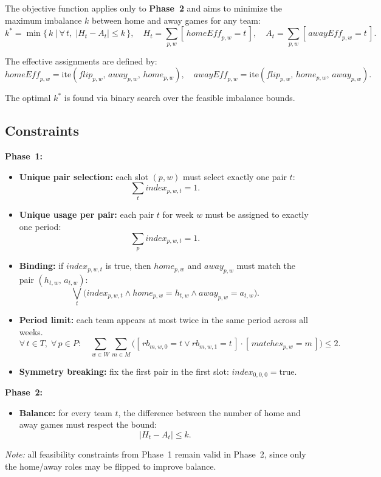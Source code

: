 The objective function applies only to \textbf{Phase~2} and aims to minimize the maximum imbalance $k$ between home and away games for any team:
\[
k^* = \min \Big\{\, k ~\Big|~ \forall\, t,\; |H_t - A_t| \leq k\, \Big\},
\quad H_t = \sum_{p,w} [\,\mathit{homeEff}_{p,w} = t\,], \quad
A_t = \sum_{p,w} [\,\mathit{awayEff}_{p,w} = t\,].
\]

The effective assignments are defined by:
\[
\mathit{homeEff}_{p,w} = \text{ite}(\mathit{flip}_{p,w},\, \mathit{away}_{p,w},\, \mathit{home}_{p,w}), \quad
\mathit{awayEff}_{p,w} = \text{ite}(\mathit{flip}_{p,w},\, \mathit{home}_{p,w},\, \mathit{away}_{p,w}).
\]

The optimal $k^*$ is found via binary search over the feasible imbalance bounds.

\subsection{Constraints}

\textbf{Phase~1:}
\begin{itemize}
    \item \textbf{Unique pair selection:} each slot $(p,w)$ must select exactly one pair $t$:
    \[
    \sum_{t} \mathit{index}_{p,w,t} = 1.
    \]
    \item \textbf{Unique usage per pair:} each pair $t$ for week $w$ must be assigned to exactly one period:
    \[
    \sum_{p} \mathit{index}_{p,w,t} = 1.
    \]
    \item \textbf{Binding:} if $\mathit{index}_{p,w,t}$ is true, then $\mathit{home}_{p,w}$ and $\mathit{away}_{p,w}$ must match the pair $(h_{t,w},\, a_{t,w})$:
    \[
    \bigvee_{t} \Big(
      \mathit{index}_{p,w,t} \wedge 
      \mathit{home}_{p,w} = h_{t,w} \wedge 
      \mathit{away}_{p,w} = a_{t,w}
    \Big).
    \]
    \item \textbf{Period limit:} each team appears at most twice in the same period across all weeks.
    \[
    \forall\, t \in T,\; \forall\, p \in P:\quad
    \sum_{w \in W}
    \sum_{m \in M}
    \big(
      [\, rb_{m,w,0} = t \vee rb_{m,w,1} = t\, ]
      \cdot [\, matches_{p,w} = m\, ]
    \big)
    \leq 2.
    \]
    \item \textbf{Symmetry breaking:} fix the first pair in the first slot: $\mathit{index}_{0,0,0} = \text{true}$.
\end{itemize}

\textbf{Phase~2:}
\begin{itemize}
    \item \textbf{Balance:} for every team $t$, the difference between the number of home and away games must respect the bound:
    \[
    |H_t - A_t| \leq k.
    \]
\end{itemize}
\textit{Note:} all feasibility constraints from Phase~1 remain valid in Phase~2, since only the home/away roles may be flipped to improve balance.

